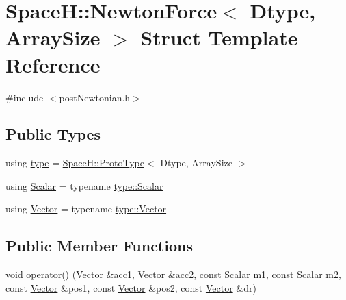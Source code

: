 \hypertarget{struct_space_h_1_1_newton_force}{}\section{SpaceH\+:\+:Newton\+Force$<$ Dtype, Array\+Size $>$ Struct Template Reference}
\label{struct_space_h_1_1_newton_force}


{\ttfamily \#include $<$post\+Newtonian.\+h$>$}

\subsection*{Public Types}
\begin{DoxyCompactItemize}
\item 
using \mbox{\hyperlink{struct_space_h_1_1_newton_force_a8d8255adf547360365ec990ff39324d6}{type}} = \mbox{\hyperlink{struct_space_h_1_1_proto_type}{Space\+H\+::\+Proto\+Type}}$<$ Dtype, Array\+Size $>$
\item 
using \mbox{\hyperlink{struct_space_h_1_1_newton_force_a26afc180e0b2f65fe0a38aedceb9616f}{Scalar}} = typename \mbox{\hyperlink{struct_space_h_1_1_proto_type_af3c8245d83d9db64749882920de5c274}{type\+::\+Scalar}}
\item 
using \mbox{\hyperlink{struct_space_h_1_1_newton_force_aeb07826be31edb8f1bbaef06c66e9565}{Vector}} = typename \mbox{\hyperlink{struct_space_h_1_1_proto_type_a316b81f4660b2b4fab14a8e1f23b6089}{type\+::\+Vector}}
\end{DoxyCompactItemize}
\subsection*{Public Member Functions}
\begin{DoxyCompactItemize}
\item 
void \mbox{\hyperlink{struct_space_h_1_1_newton_force_abef48bbbed814919f3269f9210864380}{operator()}} (\mbox{\hyperlink{struct_space_h_1_1_newton_force_aeb07826be31edb8f1bbaef06c66e9565}{Vector}} \&acc1, \mbox{\hyperlink{struct_space_h_1_1_newton_force_aeb07826be31edb8f1bbaef06c66e9565}{Vector}} \&acc2, const \mbox{\hyperlink{struct_space_h_1_1_newton_force_a26afc180e0b2f65fe0a38aedceb9616f}{Scalar}} m1, const \mbox{\hyperlink{struct_space_h_1_1_newton_force_a26afc180e0b2f65fe0a38aedceb9616f}{Scalar}} m2, const \mbox{\hyperlink{struct_space_h_1_1_newton_force_aeb07826be31edb8f1bbaef06c66e9565}{Vector}} \&pos1, const \mbox{\hyperlink{struct_space_h_1_1_newton_force_aeb07826be31edb8f1bbaef06c66e9565}{Vector}} \&pos2, const \mbox{\hyperlink{struct_space_h_1_1_newton_force_aeb07826be31edb8f1bbaef06c66e9565}{Vector}} \&dr)
\end{DoxyCompactItemize}


